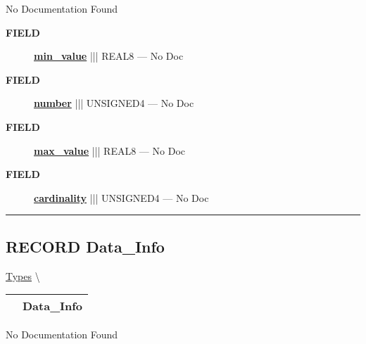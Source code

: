 No Documentation Found







\par
\begin{description}
\item [\colorbox{tagtype}{\color{white} \textbf{\textsf{FIELD}}}] \textbf{\underline{min\_value}} ||| REAL8 --- No Doc
\item [\colorbox{tagtype}{\color{white} \textbf{\textsf{FIELD}}}] \textbf{\underline{number}} ||| UNSIGNED4 --- No Doc
\item [\colorbox{tagtype}{\color{white} \textbf{\textsf{FIELD}}}] \textbf{\underline{max\_value}} ||| REAL8 --- No Doc
\item [\colorbox{tagtype}{\color{white} \textbf{\textsf{FIELD}}}] \textbf{\underline{cardinality}} ||| UNSIGNED4 --- No Doc
\end{description}





\rule{\linewidth}{0.5pt}
\subsection*{\textsf{\colorbox{headtoc}{\color{white} RECORD}
Data\_Info}}

\hypertarget{ecldoc:logisticregression.types.data_info}{}
\hspace{0pt} \hyperlink{ecldoc:LogisticRegression.Types}{Types} \textbackslash 

{\renewcommand{\arraystretch}{1.5}
\begin{tabularx}{\textwidth}{|>{\raggedright\arraybackslash}l|X|}
\hline
\hspace{0pt}\mytexttt{\color{red} } & \textbf{Data\_Info} \\
\hline
\end{tabularx}
}

\par





No Documentation Found







